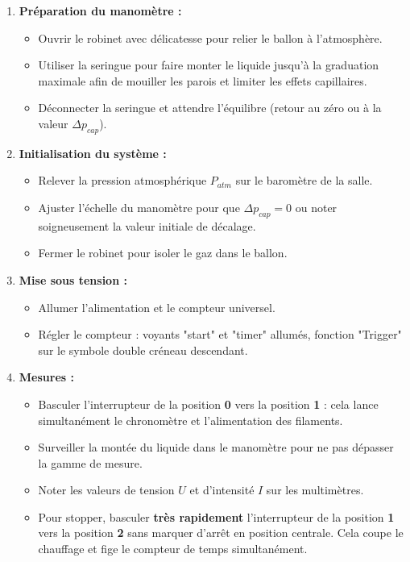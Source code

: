 \documentclass[a4paper,9pt,french]{scrartcl}
\begin{document}
\begin{enumerate}
    \item \textbf{Préparation du manomètre :} 
    \begin{itemize}
        \item Ouvrir le robinet avec délicatesse pour relier le ballon à l'atmosphère.
        \item Utiliser la seringue pour faire monter le liquide jusqu'à la graduation maximale afin de mouiller les parois et limiter les effets capillaires.
        \item Déconnecter la seringue et attendre l'équilibre (retour au zéro ou à la valeur $\Delta p_{cap}$).
    \end{itemize}

    \item \textbf{Initialisation du système :}
    \begin{itemize}
        \item Relever la pression atmosphérique $P_{atm}$ sur le baromètre de la salle.
        \item Ajuster l'échelle du manomètre pour que $\Delta p_{cap} = 0$ ou noter soigneusement la valeur initiale de décalage.
        \item Fermer le robinet pour isoler le gaz dans le ballon.
    \end{itemize}

    \item \textbf{Mise sous tension :}
    \begin{itemize}
        \item Allumer l'alimentation et le compteur universel.
        \item Régler le compteur : voyants "start" et "timer" allumés, fonction "Trigger" sur le symbole double créneau descendant.
    \end{itemize}

    \item \textbf{Mesures :}
    \begin{itemize}
        \item Basculer l'interrupteur de la position \textbf{0} vers la position \textbf{1} : cela lance simultanément le chronomètre et l'alimentation des filaments.
        \item Surveiller la montée du liquide dans le manomètre pour ne pas dépasser la gamme de mesure.
        \item Noter les valeurs de tension $U$ et d'intensité $I$ sur les multimètres.
        \item Pour stopper, basculer \textbf{très rapidement} l'interrupteur de la position \textbf{1} vers la position \textbf{2} sans marquer d'arrêt en position centrale. Cela coupe le chauffage et fige le compteur de temps simultanément.
    \end{itemize}


\end{enumerate}
\end{document}
